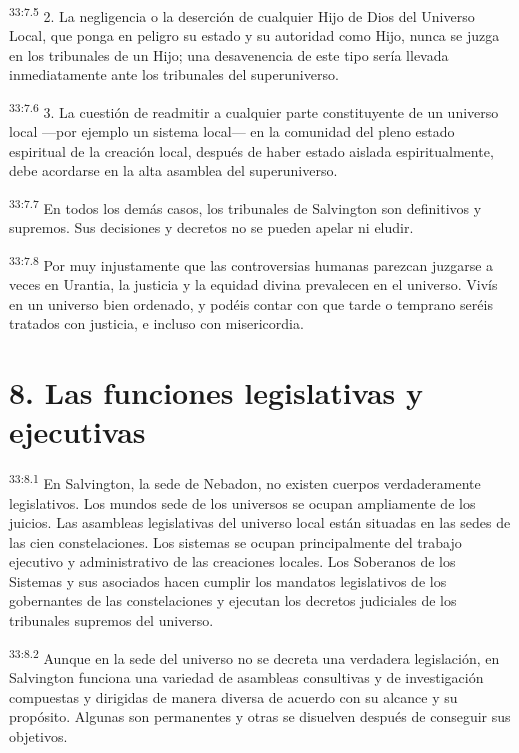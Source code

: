 \par
\textsuperscript{33:7.5} 2. La negligencia o la deserción de cualquier Hijo de Dios del Universo Local, que ponga en peligro su estado y su autoridad como Hijo, nunca se juzga en los tribunales de un Hijo; una desavenencia de este tipo sería llevada inmediatamente ante los tribunales del superuniverso.

\par
\textsuperscript{33:7.6} 3. La cuestión de readmitir a cualquier parte constituyente de un universo local ---por ejemplo un sistema local--- en la comunidad del pleno estado espiritual de la creación local, después de haber estado aislada espiritualmente, debe acordarse en la alta asamblea del superuniverso.

\par
\textsuperscript{33:7.7} En todos los demás casos, los tribunales de Salvington son definitivos y supremos. Sus decisiones y decretos no se pueden apelar ni eludir.

\par
\textsuperscript{33:7.8} Por muy injustamente que las controversias humanas parezcan juzgarse a veces en Urantia, la justicia y la equidad divina prevalecen en el universo. Vivís en un universo bien ordenado, y podéis contar con que tarde o temprano seréis tratados con justicia, e incluso con misericordia.

\section*{8. Las funciones legislativas y ejecutivas}
\par
\textsuperscript{33:8.1} En Salvington, la sede de Nebadon, no existen cuerpos verdaderamente legislativos. Los mundos sede de los universos se ocupan ampliamente de los juicios. Las asambleas legislativas del universo local están situadas en las sedes de las cien constelaciones. Los sistemas se ocupan principalmente del trabajo ejecutivo y administrativo de las creaciones locales. Los Soberanos de los Sistemas y sus asociados hacen cumplir los mandatos legislativos de los gobernantes de las constelaciones y ejecutan los decretos judiciales de los tribunales supremos del universo.

\par
\textsuperscript{33:8.2} Aunque en la sede del universo no se decreta una verdadera legislación, en Salvington funciona una variedad de asambleas consultivas y de investigación compuestas y dirigidas de manera diversa de acuerdo con su alcance y su propósito. Algunas son permanentes y otras se disuelven después de conseguir sus objetivos.

